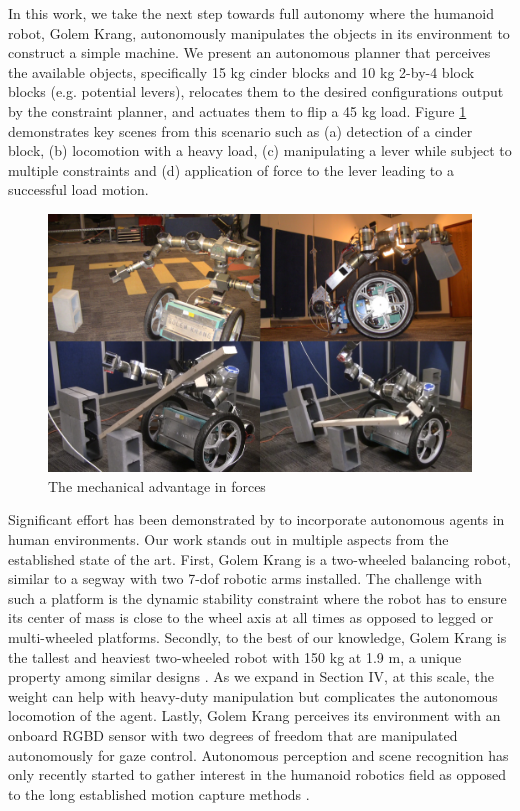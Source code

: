 \documentclass{article}
\begin{document}
In this work, we take the next step towards full autonomy where the humanoid robot, Golem Krang,
autonomously manipulates the objects in its environment to construct a simple machine. We present
an autonomous planner that perceives the available objects, specifically 15 kg cinder blocks and 10
kg 2-by-4 block blocks (e.g. potential levers), relocates them to the desired configurations output
by the constraint planner, and actuates them to flip a 45 kg load. Figure \ref{fig:showOff} demonstrates key scenes
from this scenario such as (a) detection of a cinder block, (b) locomotion with a heavy load, (c)
manipulating a lever while subject to multiple constraints and (d) application of force to the lever
leading to a successful load motion.

\begin{figure}[ht!] 
  \centering
  \includegraphics[width=1.0\linewidth]{Figures/showOff.png}
  \caption{The mechanical advantage in forces}
  \label{fig:showOff}
\end{figure}

Significant effort has been demonstrated by \cite{beetz2010cram} \cite{stilman2005navigation}
\cite{kemp2007challenges} to incorporate autonomous agents in human environments. Our work stands
out in multiple aspects from the established state of the art. First, Golem Krang is a two-wheeled
balancing robot, similar to a segway with two 7-dof robotic arms installed. The challenge with
such a platform is the dynamic stability constraint where the robot has to ensure its center of mass
is close to the wheel axis at all times as opposed to legged or multi-wheeled platforms. Secondly, to the best of our knowledge,
Golem Krang is the tallest and heaviest two-wheeled robot with 150 kg at 1.9 m, a unique property
among similar designs \cite{kuindersma2009dexterous}. As we expand in Section IV, at this scale, the
weight can help with heavy-duty manipulation but complicates the autonomous locomotion of the
agent. Lastly, Golem Krang perceives its environment with an onboard RGBD sensor with two degrees
of freedom that are manipulated autonomously for gaze control. Autonomous perception and scene
recognition has only recently started to gather interest in the humanoid robotics field
\cite{srinivasa2010herb} \cite{nishiwaki2000design} as opposed to the long established motion
capture methods \cite{dasgupta1999making}.
\end{document}
